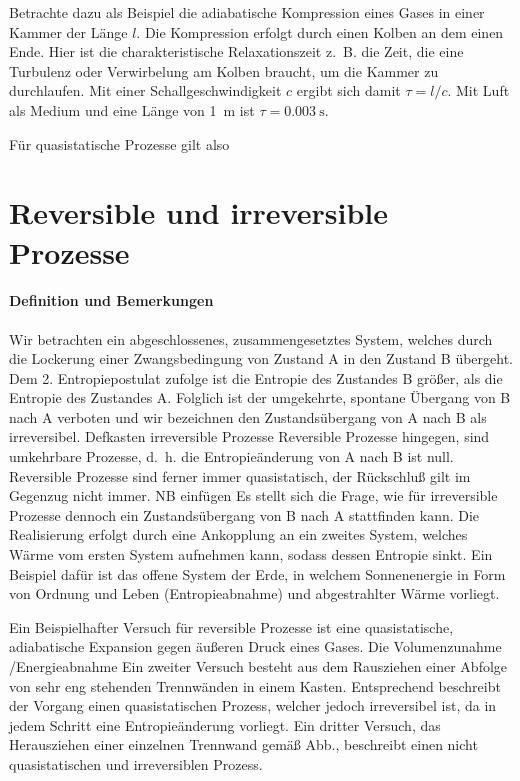 Betrachte dazu als Beispiel die adiabatische Kompression eines Gases in einer Kammer der Länge $l$. Die Kompression erfolgt durch einen Kolben an dem einen Ende. Hier ist die charakteristische Relaxationszeit z.~B. die Zeit, die eine Turbulenz oder Verwirbelung am Kolben braucht, um die Kammer zu durchlaufen. Mit einer Schallgeschwindigkeit $c$ ergibt sich damit $\tau =l/c$. Mit Luft als Medium und eine Länge von \SI{1}{\m} ist $\tau=\SI{0.003}{\s}$. 

Für quasistatische Prozesse gilt also 



\section{Reversible und irreversible Prozesse}


\paragraph*{Definition und Bemerkungen }
Wir betrachten ein abgeschlossenes, zusammengesetztes System, welches durch die Lockerung einer Zwangsbedingung von Zustand A
in den Zustand B übergeht. Dem 2. Entropiepostulat zufolge ist die Entropie des Zustandes B größer, als die Entropie des Zustandes A.
Folglich ist der umgekehrte, spontane Übergang von B nach A verboten und wir bezeichnen den Zustandsübergang von A nach B als irreversibel.
Defkasten irreversible Prozesse
Reversible Prozesse hingegen, sind umkehrbare Prozesse, d.~h. die Entropieänderung von A nach B ist null.
Reversible Prozesse sind ferner immer quasistatisch, der Rückschluß gilt im Gegenzug nicht immer.
NB einfügen
Es stellt sich die Frage, wie für irreversible Prozesse dennoch ein Zustandsübergang von B nach A stattfinden kann.
Die Realisierung erfolgt durch eine Ankopplung an ein zweites System, welches Wärme vom ersten System aufnehmen kann, sodass dessen Entropie sinkt. 
Ein Beispiel dafür ist das offene System der Erde, in welchem Sonnenenergie in Form von Ordnung und Leben (Entropieabnahme) und abgestrahlter Wärme vorliegt.

Ein Beispielhafter Versuch für reversible Prozesse ist eine quasistatische, adiabatische Expansion gegen äußeren Druck eines Gases. Die Volumenzunahme /Energieabnahme
Ein zweiter Versuch besteht aus dem Rausziehen einer Abfolge von sehr eng stehenden Trennwänden in einem Kasten. Entsprechend beschreibt der Vorgang einen quasistatischen Prozess, welcher jedoch irreversibel ist, da in jedem Schritt eine Entropieänderung vorliegt.
Ein dritter Versuch, das Herausziehen einer einzelnen Trennwand gemäß Abb., beschreibt einen nicht quasistatischen und irreversiblen Prozess.

